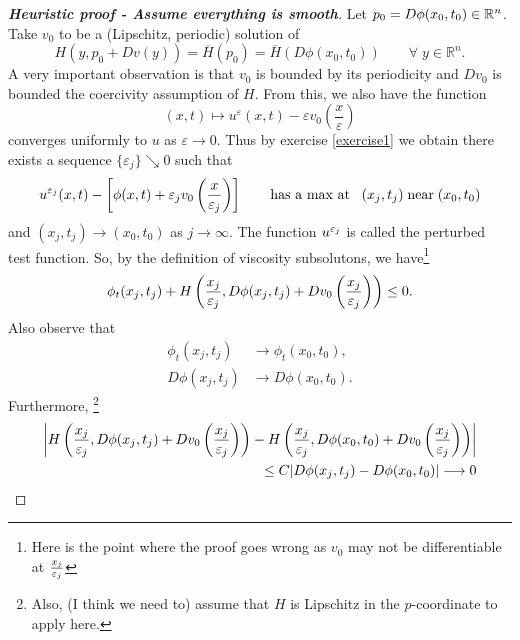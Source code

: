 \documentclass[12pt, oneside]{amsart}  	%
\begin{document}
\begin{proof}[\textbf{Heuristic proof - Assume everything is smooth}]\quad
Let $p_0=D\phi(x_0, t_0)\in \mathbb{R}^n$. Take $v_0$ to be a (Lipschitz, periodic) solution of
\begin{equation}\label{assume v is smooth solution of cell Ep0}
H(y, p_0 + Dv(y))=\overline{H}(p_0)=\overline{H}(D\phi(x_0, t_0))\qquad\forall\; y\in \mathbb{R}^n.
\end{equation}
A very important observation is that $v_0$ is bounded by its periodicity and $Dv_0$ is bounded the coercivity assumption of $H$. From this, we also have the function
\begin{equation*}
(x,t)\longmapsto  u^{\varepsilon}(x,t) - \varepsilon v_0\left(\frac{x}{\varepsilon}\right)
\end{equation*}
converges uniformly to $u$ as $\varepsilon\longrightarrow 0$. Thus by exercise \ref{exercise1} we obtain there exists a sequence $\{\varepsilon_j\} \searrow 0$ such that
\begin{equation}\label{heuristic-leq 0}
u^{\varepsilon_j}(x, t) -\left[ \phi(x, t) + \varepsilon_j v_0\left(\frac{x}{\varepsilon_j}\right)\right] \qquad\text{has a max at}\;\;\; (x_j, t_j)\;\text{near}\;(x_0,t_0)
\end{equation}
and $(x_j,t_j)\longrightarrow (x_0,t_0)$ as $j\longrightarrow \infty$. The function $u^{\varepsilon_j}$ is called the perturbed test function. So, by the definition of viscosity subsolutons, we have\footnote{Here is the point where the proof goes wrong as $v_0$ may not be differentiable at $\frac{x_j}{\varepsilon_j}$}
\begin{equation*}
\phi_t(x_j, t_j) + H\left(\frac{x_j}{\varepsilon_j}, D\phi(x_j, t_j) + Dv_0\left(\frac{x_j}{\varepsilon_j}\right)\right)\leq 0.
\end{equation*}
Also observe that
\begin{align*}
\phi_t(x_j, t_j) &\longrightarrow \phi_t(x_0, t_0),\\
D\phi(x_j, t_j)&\longrightarrow  D\phi(x_0, t_0).
\end{align*}
Furthermore, \footnote{Also, (I think we need to) assume that $H$ is Lipschitz in the $p$-coordinate to apply here.}
\begin{align*}
\left|H\left(\frac{x_j}{\varepsilon_j}, D\phi(x_j, t_j) + Dv_0\left(\frac{x_j}{\varepsilon_j}\right)\right)-H\left(\frac{x_j}{\varepsilon_j}, D\phi(x_0, t_0) + Dv_0\left(\frac{x_j}{\varepsilon_j}\right)\right)\right| \\
\le C|D\phi(x_j, t_j) - D\phi(x_0, t_0)| \longrightarrow 0
\end{align*}

\end{proof}
\end{document}

